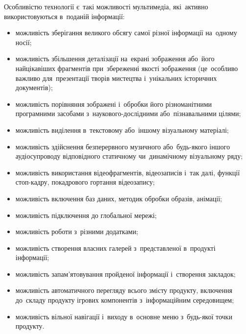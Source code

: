 \documentclass[
	a4paper,
	oneside,
	BCOR = 10mm,
	DIV = 12,
	12pt,
	headings = normal,
]{scrartcl}
\begin{document}
			Особливістю технології є~такі можливості мультимедіа, які~активно використовуються в~поданій інформації:
			\begin{itemize}[noitemsep]
				\item можливість зберігання великого обсягу самої різної інформації на~одному носії;
				\item можливість збільшення деталізації на~екрані зображення або~його найцікавіших фрагментів при~збереженні якості зображення (це~особливо важливо для~презентації творів мистецтва і~унікальних історичних документів);
				\item можливість порівняння зображені і~обробки його різноманітними програмними засобами з~наукового-дослідними або~пізнавальними цілями;
				\item можливість виділення в~текстовому або~іншому візуальному матеріалі;
				\item можливість здійснення безперервного музичного або~будь-якого іншого аудіосупроводу відповідного статичному чи~динамічному візуальному ряду;
				\item можливість використання відеофрагментів, відеозаписів і~так далі, функції стоп-кадру, покадрового гортання відеозапису;
				\item можливість включення баз даних, методик обробки образів, анімації;
				\item можливість підключення до глобальної мережі;
				\item можливість роботи з~різними додатками;
				\item можливість створення власних галерей з~представленої в~продукті інформації;
				\item можливість запам'ятовування пройденої інформації і~створення закладок;
				\item можливість автоматичного перегляду всього змісту продукту, включення до~складу продукту ігрових компонентів з~інформаційним середовищем;
				\item можливість вільної навігації і~виходу в~основне меню з~будь-якої точки продукту.
			\end{itemize}
\end{document}
